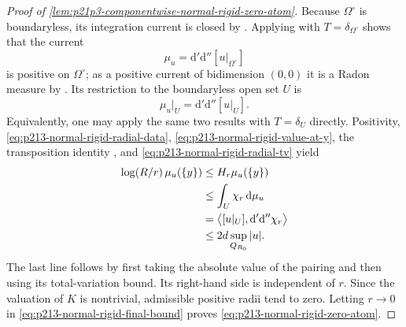 \begin{proof}[Proof of
\cref{lem:p21p3-componentwise-normal-rigid-zero-atom}]
Because $\Omega^\circ$ is boundaryless, its integration current is closed
by \cite[\S7.7.4]{CLD25}.  Applying \cite[Lemma~8.5.5]{CLD25} with
$T=\delta_{\Omega^\circ}$ shows that the current
\[
                         \mu_u
       =\mathrm d'\mathrm d''[u|_{\Omega^\circ}]
\]
is positive on $\Omega^\circ$; as a positive current of bidimension
$(0,0)$ it is a Radon measure by \cite[Proposition~7.2.8]{CLD25}.  Its
restriction to the boundaryless open set $U$ is
\[
                 \mu_u|_U=\mathrm d'\mathrm d''[u|_U].
\]
Equivalently, one may apply the same two results with $T=\delta_U$
directly.  Positivity,
\eqref{eq:p213-normal-rigid-radial-data},
\eqref{eq:p213-normal-rigid-value-at-y}, the transposition identity
\cite[Lemma~7.7.5]{CLD25}, and
\eqref{eq:p213-normal-rigid-radial-tv} yield
\begin{align}
 \log(R/r)\,\mu_u(\{y\})
 &\leq H_r\mu_u(\{y\})                                      \notag\\
 &\leq\int_U\chi_r\,\mathrm d\mu_u                          \notag\\
 &=\bigl\langle[u|_U],\mathrm d'\mathrm d''\chi_r\bigr\rangle \notag\\
 &\leq 2d\sup_{Q_{R_0}}|u|.
\label{eq:p213-normal-rigid-final-bound}
\end{align}
The last line follows by first taking the absolute value of the pairing and
then using its total-variation bound.  Its right-hand side is independent of
$r$.  Since the valuation of $K$ is nontrivial, admissible positive radii
tend to zero.  Letting $r\to0$ in
\eqref{eq:p213-normal-rigid-final-bound} proves
\eqref{eq:p213-normal-rigid-zero-atom}.
\end{proof}


